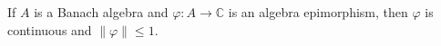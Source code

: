 \begin{lemma}
If $A$ is a Banach algebra and $\varphi: A \to \mathbb{C}$ is an algebra epimorphism, then $\varphi$ is continuous and $\|\varphi\| \leq 1$.
\end{lemma}
